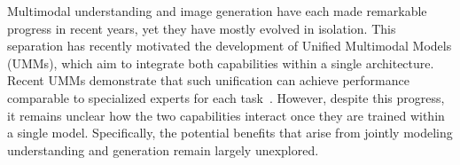 
Multimodal understanding and image generation have each made remarkable progress in recent years, yet they have mostly evolved in isolation. This separation has recently motivated the development of Unified Multimodal Models (UMMs), which aim to integrate both capabilities within a single architecture. Recent UMMs demonstrate that such unification can achieve performance comparable to specialized experts for each task~\cite{deng2025bagel, cui2025emu3,chen2505blip3,chen2025januspro,xin2025lumina, xu2025qwen3omni}.
However, despite this progress, it remains unclear how the two capabilities interact once they are trained within a single model. Specifically, the potential benefits that arise from jointly modeling understanding and generation remain largely unexplored.

